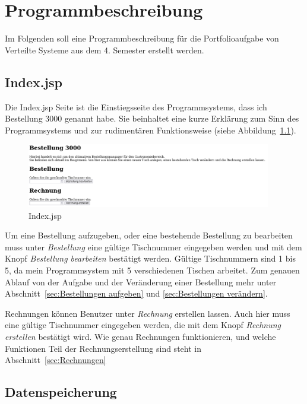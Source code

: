 \chapter{Programmbeschreibung} %
\label{chap:Programmbeschreibung}

Im Folgenden soll eine Programmbeschreibung für die Portfolioaufgabe von Verteilte Systeme aus dem 4. Semester erstellt werden.

\section{Index.jsp} %
\label{sec:Index.jsp}

Die Index.jsp Seite ist die Einstiegsseite des Programmsystems, dass ich Bestellung 3000 genannt habe.
Sie beinhaltet eine kurze Erklärung zum Sinn des Programmsystems und zur rudimentären Funktionsweise (siehe Abbildung~\ref{abb:IndexJSP}).

\begin{figure}[htb]
  \centering
  \includegraphics[width=0.95\textwidth]{images/IndexJSP.png}
  \caption[Index.jsp]{Index.jsp}
  \label{abb:IndexJSP}
\end{figure}

Um eine Bestellung aufzugeben, oder eine bestehende Bestellung zu bearbeiten muss unter \textit{Bestellung} eine gültige Tischnummer eingegeben werden und mit dem Knopf \textit{Bestellung bearbeiten} bestätigt werden.
Gültige Tischnummern sind 1 bis 5, da mein Programmsystem mit 5 verschiedenen Tischen arbeitet.
Zum genauen Ablauf von der Aufgabe und der Veränderung einer Bestellung mehr unter Abschnitt~\ref{sec:Bestellungen aufgeben} und \ref{sec:Bestellungen verändern}.

Rechnungen können Benutzer unter \textit{Rechnung} erstellen lassen.
Auch hier muss eine gültige Tischnummer eingegeben werden, die mit dem Knopf \textit{Rechnung erstellen} bestätigt wird.
Wie genau Rechnungen funktionieren, und welche Funktionen Teil der Rechnungserstellung sind steht in Abschnitt~\ref{sec:Rechnungen}


\section{Datenspeicherung} %
\label{sec:Datenspeicherung}

